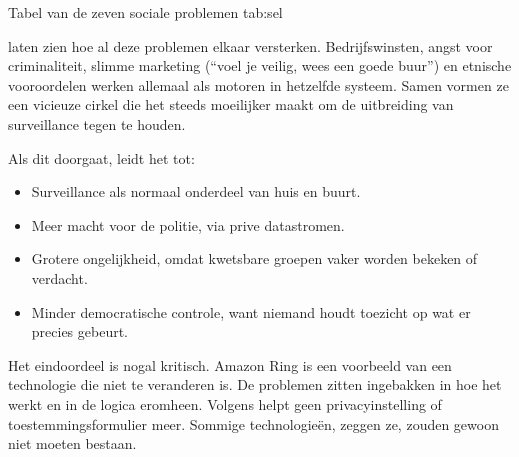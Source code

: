 \documentclass[nonacm,sigconf]{acmart}
\begin{document}
    \vertspace {}

    \SimpleTable
    {Tabel van de zeven sociale problemen}
    {tab:sel}
    {
    }

    \noindent\citeauthor{selinger2022amazon} laten zien hoe al deze problemen elkaar versterken.
    Bedrijfswinsten, angst voor criminaliteit, slimme marketing (“voel je veilig, wees een goede buur”) en etnische vooroordelen werken allemaal als motoren in hetzelfde systeem.
    Samen vormen ze een vicieuze cirkel die het steeds moeilijker maakt om de uitbreiding van surveillance tegen te houden.

    \noindent Als dit doorgaat, leidt het tot:
    \begin{itemize}
        \item Surveillance als normaal onderdeel van huis en buurt.
        \item Meer macht voor de politie, via prive datastromen.
        \item Grotere ongelijkheid, omdat kwetsbare groepen vaker worden bekeken of verdacht.
        \item Minder democratische controle, want niemand houdt toezicht op wat er precies gebeurt.
    \end{itemize}

    \noindent Het eindoordeel is nogal kritisch.
    Amazon Ring is een voorbeeld van een technologie die niet te veranderen is.
    De problemen zitten ingebakken in hoe het werkt en in de logica eromheen.
    Volgens \citeauthor{selinger2022amazon} helpt geen privacyinstelling of toestemmingsformulier meer.
    Sommige technologieën, zeggen ze, zouden gewoon niet moeten bestaan.
\end{document}
